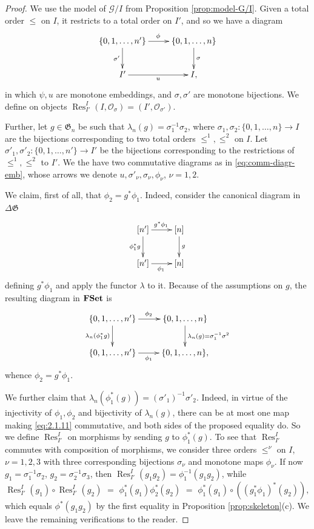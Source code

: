 \documentclass[english,11pt,leqno]{article}
\def\Gen{\mathfrak{G}}
\def\Gc{\mathcal{G}}
\def\Oc{\mathcal{O}}
\def\Res{\operatorname{Res}\nolimits}
\def\be{\begin{equation}}
\def\ee{\end{equation}}
\def\DG{ {\Delta \Gen}}
\def\FSet{{\bf FSet}}
\theoremstyle{definition}
\theoremstyle{remark}
\numberwithin{equation}{section}
\begin{document}
\begin{proof} We use the model of $\Gc/I$ from Proposition \ref{prop:model-G/I}. Given a total order $\leq $ on $I$,
it restricts to a total order on $I'$, and so we have a diagram
\be\label{eq:comm-diagr-emb}
\xymatrix{
\{0,1,\dots, n'\} 
\ar[d]_{\sigma'}
\ar[r]^\phi& \{0,1, \dots, n\}\ar[d]^\sigma
\\
I'\ar[r]_u& I,
}
\ee
in which $\psi, u$ are monotone embeddings, and $\sigma,\sigma'$ are monotone bijections. We define on objects
$\Res^I_{I'}(I,\Oc_\sigma)=(I', \Oc_{\sigma'})$. 

Further, let $g\in\Gen_n$ be such that $\lambda_n(g)=\sigma_1^{-1}\sigma_2$, where 
$\sigma_1, \sigma_2: \{0,1, \dots, n\}\to I$ are the bijections corresponding to two total orders
$\leq^1, \leq^2$ on $I$. Let $\sigma'_1, \sigma'_2: \{0,1,\dots, n'\}\to I'$ be the
bijections corresponding to the restrictions of $\leq^1, \leq^2$ to $I'$. We the have two commutative
diagrams as in \eqref{eq:comm-diagr-emb}, whose arrows we denote $u, \sigma'_\nu, \sigma_\nu, \phi_\nu$,
$\nu=1,2$. 

We claim, first of all, that $\phi_2=g^*\phi_1$. Indeed, consider the canonical diagram in $\DG$
\[
\xymatrix{
[n']\ar[d]_{\phi_1^*g}
\ar[r]^{g^*\phi_1}&[n]
\ar[d]^g
\\
[n']\ar[r]_{\phi_1}& [n]
}
\]
defining $g^*\phi_1$ and apply the functor $\lambda$ to it. Because of the assumptions on $g$, the resulting diagram
in $\FSet$ is 
\be\label{eq:2.1.11}
\xymatrix{
\{0,1,\dots, n'\}
\ar[d]_{\lambda_n(\phi_1^*g)}
\ar[r]^{\phi_2}& \{0,1,\dots, n\}
\ar[d]^{\lambda_n(g)=\sigma_1^{-1}\sigma^2}
\\
\{0,1,\dots, n'\}\ar[r]_{\phi_1}& \{0,1,\dots, n\},
}
\ee
whence $\phi_2=g^*\phi_1$.

We further claim that
$\lambda_n(\phi_1^*(g)) = (\sigma'_1)^{-1}\sigma'_2$. Indeed, in virtue of the injectivity of
$\phi_1, \phi_2$ and bijectivity of $\lambda_n(g)$, there can be at most one map making 
\eqref{eq:2.1.11} commutative, and both sides of the proposed equality do.
So we define $\Res^I_{I'}$ on morphisms by sending $g$ to $\phi_1^*(g)$.
To see that $\Res^I_{I'}$ commutes with composition of morphisms, we consider three orders
$\leq^\nu$ on $I$, $\nu=1,2,3$ with three corresponding bijections $\sigma_\nu$ and monotone maps
$\phi_\nu$. If now
$g_1=\sigma_1^{-1}\sigma_2$, $g_2=\sigma_2^{-1}\sigma_3$, then
$\Res^I_{I'}(g_1g_2)  = \phi_1^{-1}(g_1g_2)$, while
\[
\Res^I_{I'}(g_1) \circ\Res^I_{I'}(g_2) \,\,=\,\,\phi_1^*(g_1)\phi_2^*(g_2) \,\,=\,\,
\phi_1^*(g_1) \circ ((g_1^*\phi_1)^*(g_2)),
\]
which equals $\phi^*(g_1g_2)$ by the first equality in Proposition \ref{prop:skeleton}(c). We leave the
remaining verifications to the reader. 
\end{proof}
\end{document}
